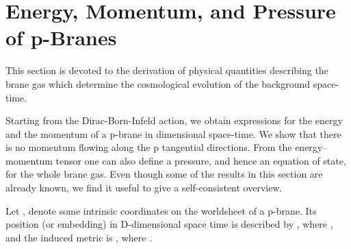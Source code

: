 \documentclass[a4paper,twocolumn,nofootinbib,tightenlines,prd,aps,
               superscriptaddress]{revtex4} %
\providecommand{\si}{\sigma}
\providecommand{\ga}{\gamma}
\begin{document}


\section{Energy, Momentum, and Pressure of  p-Branes}
\label{sec:energy}

This section is devoted to the derivation of physical quantities
describing the brane gas which determine the cosmological
evolution of the background space-time.

Starting from the Dirac-Born-Infeld action, we obtain expressions
for the energy and the momentum of a p-brane in \coordHE{}
dimensional space-time. We show that there is no momentum flowing
along the p tangential directions. From the energy--momentum
tensor one can also define a pressure, and hence an equation of
state, for the whole brane gas.
Even though some of the results in this section are already known,
we find it useful to give a self-consistent overview.

Let \myHighlight{$\si=(\si^0,\si^i), i=1,\cdots,p$}\coordHE{}, denote some intrinsic
coordinates on the worldsheet of a p-brane. Its position (or
embedding) in D-dimensional space time is described by
\myHighlight{$x^{\mu}=X^{\mu}(\si)$}\coordHE{}, where \coordHE{}, and the induced
metric is \myHighlight{$\ga_{ab}=\eta_{\mu\nu} X^\mu_{,a} X^\nu_{,b}$}\coordHE{}, where
\coordHE{}.
\end{document}
